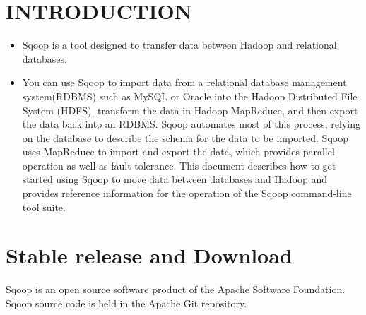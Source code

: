 \documentclass[a4paper,12pt,oneside]{sphinxmanual}
\begin{document}
\section{INTRODUCTION}
\label{document:id12}\begin{itemize}
\item {} 
Sqoop is a tool designed to transfer data between Hadoop and relational databases.

\item {} 
You can use Sqoop to import data from a relational database management system(RDBMS) such as MySQL or Oracle into the Hadoop Distributed File System (HDFS), transform the data in Hadoop MapReduce, and then export the data back into an RDBMS. Sqoop automates most of this process, relying on the database to describe the schema for the data to be imported. Sqoop uses MapReduce to import and export the data, which provides parallel operation as well as fault tolerance. This document describes how to get started using Sqoop to move data between databases and Hadoop and provides reference information for the operation of the Sqoop command-line tool suite.

\end{itemize}
\begin{figure}[htbp]
\centering

\end{figure}


\section{Stable release and Download}
\label{document:stable-release-and-download}
Sqoop is an open source software product of the Apache Software Foundation.
Sqoop source code is held in the Apache Git repository.
\end{document}
